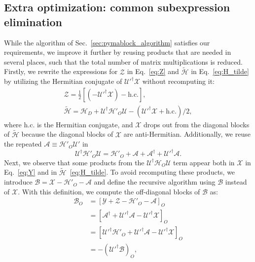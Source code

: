 \subsection{Extra optimization: common subexpression elimination}
While the algorithm of Sec.~\ref{sec:pymablock_algorithm} satisfies our requirements, we improve it further by reusing products that are needed in several places, such that the total number of matrix multiplications is reduced.
Firstly, we rewrite the expressions for $\mathcal{Z}$ in Eq.~\eqref{eq:Z} and $\tilde{\mathcal{H}}$ in Eq.~\eqref{eq:H_tilde} by utilizing the Hermitian conjugate of $\mathcal{U}'^\dagger \mathcal{X}$ without recomputing it:
%
\begin{gather*}
\mathcal{Z} = \frac{1}{2}\left[(-\mathcal{U}'^\dagger \mathcal{X})- \textrm{h.c.}\right],\\
\tilde{\mathcal{H}} = \mathcal{H}_{D} + \mathcal{U}^\dagger \mathcal{H}'_{O} \mathcal{U} - (\mathcal{U}'^\dagger \mathcal{X} + \textrm{h.c.})/2,
\end{gather*}
%
where $\textrm{h.c.}$ is the Hermitian conjugate, and $\mathcal{X}$ drops out from the diagonal blocks of $\tilde{\mathcal{H}}$ because the diagonal blocks of $\mathcal{X}$ are anti-Hermitian.
%
Additionally, we reuse the repeated $\mathcal{A} \equiv \mathcal{H}'_{O}\mathcal{U}'$ in
%
\begin{equation}
\label{eq:UHU}
\mathcal{U}^\dagger \mathcal{H}'_{O} \mathcal{U} = \mathcal{H}'_{O} + \mathcal{A} + \mathcal{A}^\dagger + \mathcal{U}'^\dagger \mathcal{A}.
\end{equation}
%
Next, we observe that some products from the $\mathcal{U}^{\dagger} \mathcal{H}_{O}\mathcal{U}$ term appear both in $\mathcal{X}$ in Eq.~\eqref{eq:Y} and in $\tilde{\mathcal{H}}$~\eqref{eq:H_tilde}.
%
To avoid recomputing these products, we introduce $\mathcal{B} = \mathcal{X} - \mathcal{H}'_{O} - \mathcal{A}$ and define the recursive algorithm using $\mathcal{B}$ instead of $\mathcal{X}$.
%
With this definition, we compute the off-diagonal blocks of $\mathcal{B}$ as:
%
\begin{equation}
\label{eq:B_offdiag}
\begin{aligned}
  \mathcal{B}_O &= \left[\mathcal{Y} + \mathcal{Z} - \mathcal{H}'_{O} - \mathcal{A} \right]_O\\
  &= \left[\mathcal{A}^\dagger + \mathcal{U}'^\dagger\mathcal{A} - \mathcal{U}'^\dagger \mathcal{X} \right]_O\\
  &= \left[\mathcal{U}'^\dagger\mathcal{H}'_{O} + \mathcal{U}'^\dagger\mathcal{A} - \mathcal{U}'^\dagger \mathcal{X} \right]_O\\
  &= -(\mathcal{U'}^\dagger \mathcal{B})_O,
\end{aligned}
\end{equation}
